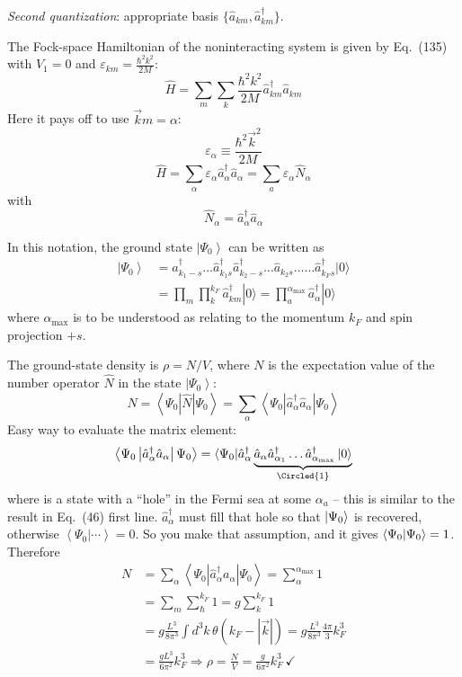 \documentclass[12pt]{article}
\newcommand{\be}{\begin{equation}}
\newcommand{\ee}{\end{equation}}
\begin{document}

\emph{Second quantization}: appropriate basis $\{\hat{a}_{k m}, \hat{a}^\dagger_{k m}\}$.

The Fock-space Hamiltonian of the noninteracting system
is given by Eq.~(135) with $V_{1}=0$ and $\varepsilon_{k m}=\frac{\hbar^{2} k^{2}}{2 M}$:
\setcounter{equation}{159}
\be
\hat{H}=\sum_{m} \sum_{k} 
\frac{\hbar^{2} k^{2}}{2 M} \hat{a}^\dagger_{k m} \hat{a}_{k m}
\ee
Here it pays off to use $\vec{k}m = \alpha$:
\be
\varepsilon_{\alpha} \equiv \frac{\hbar^{2} \vec{k}^{2}}{2 M}
\ee
\be
\hat{H}=\sum_{\alpha} \varepsilon_{\alpha} \hat{a}_{\alpha}^{\dagger} \hat{a}_{\alpha}=\sum_{a} \varepsilon_{\alpha} \hat{N}_{\alpha}
\ee
with
\be
\hat{N}_\alpha = \hat{a}_{\alpha}^{\dagger} \hat{a}_{\alpha}
\ee

In this notation, the ground state $\left|\Psi_{0}\right\rangle$ can be
written as
\be
\begin{aligned}
\left|\Psi_{0}\right\rangle
&=a_{k_{1}-s}^{\dagger} \ldots \hat{a}_{k_{1} s}^{\dagger} \hat{a}_{k_{2}-s}^{\dagger} \ldots \hat{a}_{k_{2} s} \ldots \ldots \hat{a}_{k_{F} s}^{\dagger}|0\rangle\\
&=\prod_{m} \prod_{k}^{k_{F}} \hat{a}_{km}^{\dagger}|0\rangle
=\prod_{a}^{\alpha_{\text {max}}} \hat{a}_{\alpha}^{\dagger} |0\rangle
\end{aligned}
\label{eq:g164}
\ee
where $\alpha_{\text {max}}$ is to be understood as relating to the
momentum $k_{F}$ and spin projection $+s$.


The ground-state density is $\rho=N / V$, where $N$ is the expectation
value of the number operator $\hat{N}$ in the state $\left|\Psi_{0}\right\rangle$:
\be
N=\left\langle\Psi_{0}|\hat{N}| \Psi_{0}\right\rangle=\sum_{\alpha}\left\langle\Psi_{0}\left|\hat{a}^\dagger_{\alpha} \hat{a}_{\alpha}\right| \Psi_{0}\right\rangle
\ee
Easy way to evaluate the matrix element:
\[
\left\langle\Psi_{0}\left|\hat{a}^\dagger_{\alpha} \hat{a}_{\alpha}\right| \Psi_{0}\right\rangle = 
\langle\Psi_{0}|\hat{a}^\dagger_{\alpha} 
\underbrace{\hat{a}_{\alpha}\hat{a}^\dagger_{\alpha_1}\ldots\hat{a}^\dagger_{\alpha_{\text {max}}} \ket{0}}%
_{\Circled{1}}
\]
where  is a
state with a ``hole'' in
the Fermi sea at some
$\alpha_{a}$ -- this is similar
to the result in
Eq.~(46) first line.
$\hat{a}_{\alpha}^\dagger$ must fill that hole
so that $\ket{\Psi_{0}}$ is recovered,
otherwise $\left\langle\Psi_{0} | \cdots\right\rangle=0$.
So you make that assumption, and it gives $\bra{\Psi_0}\ket{\Psi_0} = 1$.
Therefore
\be
\begin{aligned}
N
&=\sum_{\alpha}\left\langle\Psi_{0}\left|\hat{a}_{\alpha}^{\dagger} a_{\alpha}\right| \Psi_{0}\right\rangle=\sum_{\alpha}^{\alpha_{\text {max}}} 1\\
&= \sum_{m} \sum_{\hbar}^{k_{F}} 1=g \sum_{k}^{k_{F}} 1\\
&= g \frac{L^3}{8 \pi^{3}} \int d^{3} k \,\theta\!\left(k_{F}-\left|\vec{k}\right|\right) = 
g \frac{L^3}{8 \pi^{3}}  \frac{4 \pi}{3}k_{F}^{3}\\
& = \frac{gL^3}{6 \pi^{2}} k_{F}^{3} \Rightarrow \rho = \frac{N}{V} 
= \frac{g}{6 \pi^{2}} k_{F}^{3}\,\checkmark
\end{aligned}
\ee
\end{document}
